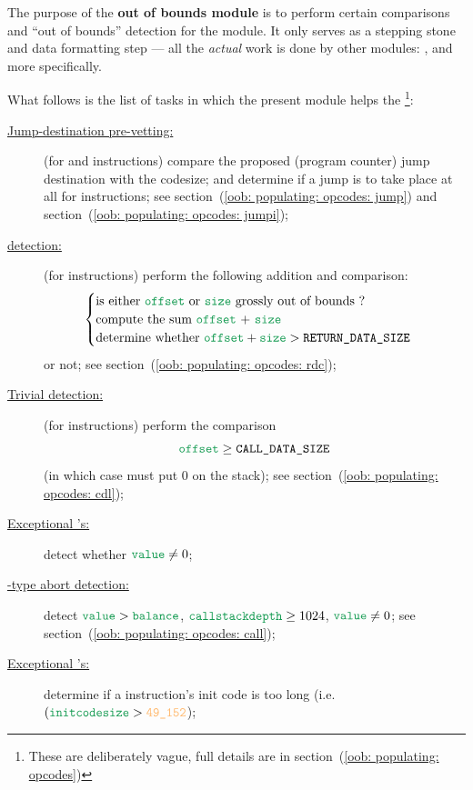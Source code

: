 The purpose of the \textbf{out of bounds module} \oobMod{} is to perform certain comparisons and ``out of bounds'' detection for the \hubMod{} module.
It only serves as a stepping stone and data formatting step --- all the \emph{actual} work is done by other modules: \addMod{}, \modMod{} and \wcpMod{} more specifically.

What follows is the list of tasks in which the present module helps the \hubMod{}\footnote{These are deliberately vague, full details are in section~(\ref{oob: populating: opcodes})}:
\begin{description}
	\item[\underline{Jump-destination pre-vetting:}]
		(for  and  instructions) compare the proposed (program counter) jump destination with the codesize;
		and determine if a jump is to take place at all for  instructions;
		see section~(\ref{oob: populating: opcodes: jump}) and section~(\ref{oob: populating: opcodes: jumpi});
	\item[\underline{\rdcxSH{} detection:}]
		(for  instructions) perform the following addition and comparison: 
		\[
			\begin{cases}
				\text{is either \loc{offset} or \loc{size} grossly out of bounds ?} \\
				\text{compute the sum \loc{offset} + \loc{size}}                    \\
				\text{determine whether $\loc{offset} + \loc{size} > \RDS$}         \\
			\end{cases}
		\]
		or not;
		see section~(\ref{oob: populating: opcodes: rdc});
	\item[\underline{Trivial  detection:}]
		(for  instructions) perform the comparison
		\[
			\loc{offset} \geq \CDS
		\]
		(in which case  must put $0$ on the stack);
		see section~(\ref{oob: populating: opcodes: cdl});
	\item[\underline{Exceptional 's:}]
		detect whether $\loc{value} \neq 0$;
	\item[\underline{-type abort detection:}]
		detect $\loc{value} > \loc{balance}$, $\loc{callstackdepth} \ge 1024$, $\loc{value} \neq 0$;
		see section~(\ref{oob: populating: opcodes: call});
	\item[\underline{Exceptional 's:}]
		determine if a  instruction's init code is too long (i.e. $(\loc{initcodesize} > \maxInitCodeSizeValue$);

\end{description}
